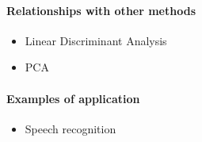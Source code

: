 \paragraph{Relationships with other methods}
\begin{itemize}
    \item Linear Discriminant Analysis
    \item PCA
\end{itemize}

\paragraph{Examples of application}
\begin{itemize}
    \item Speech recognition
\end{itemize}


